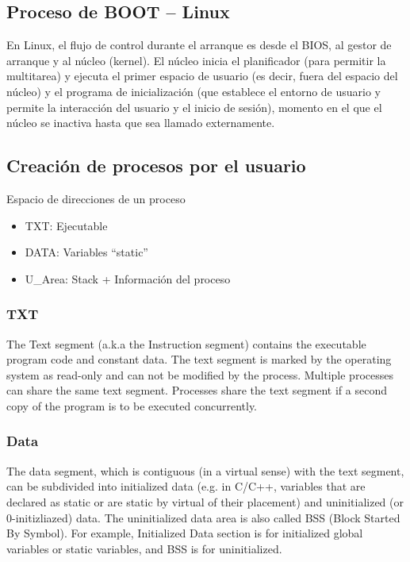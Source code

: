 \documentclass[a4paper, twoside]{article}
\begin{document}
\subsection{Proceso de BOOT – Linux}

En Linux, el flujo de control durante el arranque es desde el BIOS,
al gestor de arranque y al núcleo (kernel). 
El núcleo inicia el planificador (para permitir la multitarea) y ejecuta el
primer espacio de usuario (es decir, fuera del espacio del núcleo) y
el programa de inicialización (que establece el entorno de usuario y
permite la interacción del usuario y el inicio de sesión), momento en el que
el núcleo se inactiva hasta que sea llamado externamente.

\subsection{Creación de procesos por el usuario}

Espacio de direcciones de un proceso

\begin{itemize}
  \item TXT: Ejecutable
  \item DATA: Variables ``static''
  \item U\_Area: Stack + Información del proceso
\end{itemize}

\subsubsection{TXT}

The Text segment (a.k.a the Instruction segment) contains the executable
program code and constant data.
The text segment is marked by the operating system as read-only and can not be
modified by the process.
Multiple processes can share the same text segment.
Processes share the text segment if a second copy of the program is to be
executed concurrently.

\subsubsection{Data}

The data segment, which is contiguous (in a virtual sense) with the text
segment, can be subdivided into initialized data (e.g. in C/C++, variables that
are declared as static or are static by virtual of their placement) and
uninitialized (or 0-initizliazed) data.
The uninitialized data area is also called BSS (Block Started By Symbol).
For example, Initialized Data section is for initialized global variables or
static variables, and BSS is for uninitialized.
\end{document}

